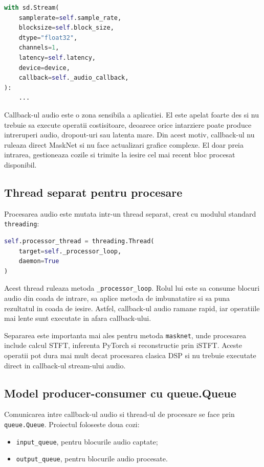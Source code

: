 \documentclass[12pt,a4paper]{article}
\begin{document}
\begin{lstlisting}[language=Python]
with sd.Stream(
    samplerate=self.sample_rate,
    blocksize=self.block_size,
    dtype="float32",
    channels=1,
    latency=self.latency,
    device=device,
    callback=self._audio_callback,
):
    ...
\end{lstlisting}

Callback-ul audio este o zona sensibila a aplicatiei. El este apelat foarte des
si nu trebuie sa execute operatii costisitoare, deoarece orice intarziere poate
produce intreruperi audio, dropout-uri sau latenta mare. Din acest motiv,
callback-ul nu ruleaza direct MaskNet si nu face actualizari grafice complexe.
El doar preia intrarea, gestioneaza cozile si trimite la iesire cel mai recent
bloc procesat disponibil.

\subsection{Thread separat pentru procesare}

Procesarea audio este mutata intr-un thread separat, creat cu modulul standard
\texttt{threading}:

\begin{lstlisting}[language=Python]
self.processor_thread = threading.Thread(
    target=self._processor_loop,
    daemon=True
)
\end{lstlisting}

Acest thread ruleaza metoda \texttt{\_processor\_loop}. Rolul lui este sa consume
blocuri audio din coada de intrare, sa aplice metoda de imbunatatire si sa puna
rezultatul in coada de iesire. Astfel, callback-ul audio ramane rapid, iar
operatiile mai lente sunt executate in afara callback-ului.

Separarea este importanta mai ales pentru metoda \texttt{masknet}, unde
procesarea include calcul STFT, inferenta PyTorch si reconstructie prin iSTFT.
Aceste operatii pot dura mai mult decat procesarea clasica DSP si nu trebuie
executate direct in callback-ul stream-ului audio.

\subsection{Model producer-consumer cu queue.Queue}

Comunicarea intre callback-ul audio si thread-ul de procesare se face prin
\texttt{queue.Queue}. Proiectul foloseste doua cozi:

\begin{itemize}
    \item \texttt{input\_queue}, pentru blocurile audio captate;
    \item \texttt{output\_queue}, pentru blocurile audio procesate.
\end{itemize}
\end{document}
